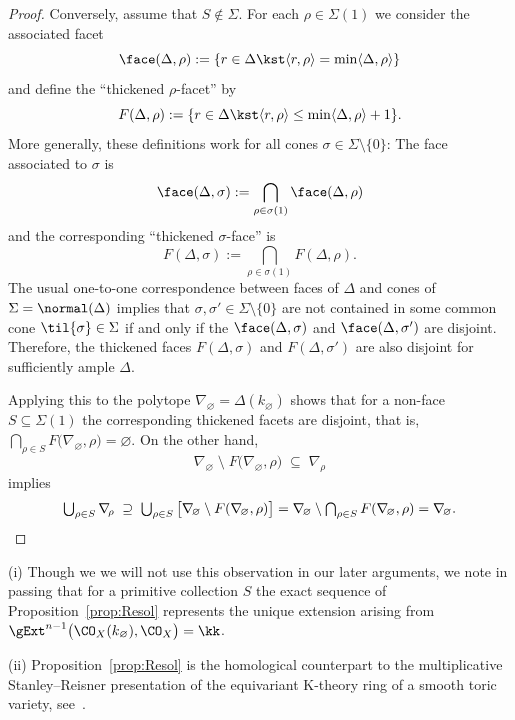 \begin{proof}
Conversely, assume that $S\notin\Sigma$.
For each $\rho\in\Sigma(1)$ we consider 
the associated facet 
$$
\face(\Delta,\rho):=\{r\in\Delta\kst \langle r,\rho\rangle
=\min\langle\Delta,\rho\rangle\}
$$ 
and define the ``thickened $\rho$-facet'' 
by
$$
F(\Delta,\rho):=\{r\in\Delta\kst \langle r,
\rho\rangle \leq
\min\langle\Delta,\rho\rangle + 1\}.
$$
More generally, these definitions work 
for all cones 
$\sigma\in\Sigma\setminus\{0\}$:
The face associated to $\sigma$ is
$$
\face(\Delta,\sigma):=
\bigcap_{\rho\in\sigma(1)}\face(\Delta,\rho)
$$
and the corresponding ``thickened 
$\sigma$-face'' is 
$$
F(\Delta,\sigma):=\bigcap_{\rho\in\sigma(1)}
F(\Delta,\rho).
$$
The usual one-to-one correspondence between 
faces of $\Delta$ and cones of
$\Sigma=\normal(\Delta)$ implies that 
$\sigma,\sigma'\in\Sigma\setminus\{0\}$
are not contained in some common cone 
$\til{\sigma}\in\Sigma$ if and only if the
$\face(\Delta,\sigma)$ and 
$\face(\Delta,\sigma')$ are disjoint. 
Therefore, the thickened faces 
$F(\Delta,\sigma)$ and $F(\Delta,\sigma')$ are 
also disjoint for sufficiently ample $\Delta$.

Applying this to the polytope 
$\nabla_{\!\varnothing}=\Delta(k_{\varnothing})$
shows that for a non-face $S\subseteq\Sigma(1)$
the corresponding thickened facets are disjoint, 
that is, 
$\bigcap_{\rho\in S}F\big(\nabla_{\!\varnothing},
\rho\big)=\varnothing$. On the other hand, 
$$
\nabla_{\!\varnothing} \;\setminus\;
F\big(\nabla_{\!\varnothing},\rho\big)
\;\subseteq\; \nabla_{\!\rho}
$$
implies
$$
\renewcommand{\arraystretch}{1.3}
\textstyle
\bigcup_{\rho\in S}\nabla_{\!\rho}
\;\supseteq\; \bigcup_{\rho\in S}\big[
\nabla_{\!\varnothing} \setminus 
F(\nabla_{\!\varnothing},\rho)\big]
=  \nabla_{\!\varnothing} \setminus
\bigcap_{\rho\in S} F(\nabla_{\!\varnothing},\rho)
=  \nabla_{\!\varnothing}.
\vspace{-4ex}
$$
\vspace{2ex}
\end{proof}

\begin{rema}\label{rem:PC}
(i) Though we we will not use this observation 
in our later arguments, we note in passing
that for a primitive collection $S$ the 
exact sequence of Proposition~\ref{prop:Resol} 
represents the unique extension arising from 
$\gExt^{n-1}\big(\CO_X(k_\varnothing),\CO_X\big)=\kk$.

{(ii) Proposition~\ref{prop:Resol} 
is the homological counterpart to the multiplicative 
Stanley--Reisner presentation of the equivariant 
K-theory ring of a smooth toric variety, see~\cite{vv}.}
\end{rema}

